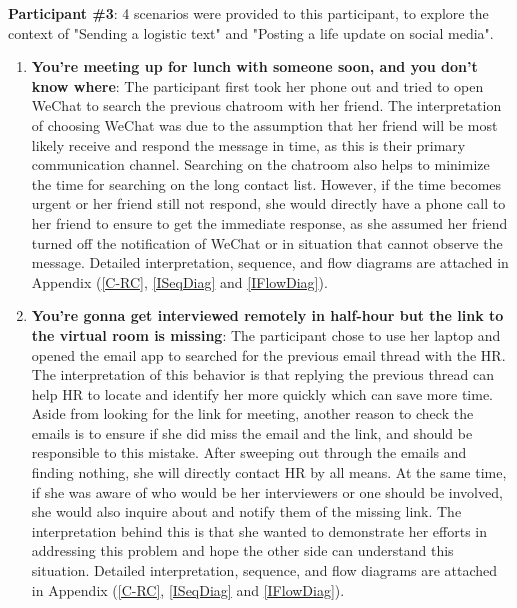 \documentclass[acmsmall,screen,authorversion,nonacm]{acmart}
\begin{document}
\vspace{7pt}

\textbf{Participant \#3}: 4 scenarios were provided to this participant, to explore the context of "Sending a logistic text" and "Posting a life update on social media".

\begin{center}
\begin{enumerate}
    \item \textbf{You’re meeting up for lunch with someone soon, and you don’t know where}: The participant first took her phone out and tried to open WeChat to search the previous chatroom with her friend. The interpretation of choosing WeChat was due to the assumption that her friend will be most likely receive and respond the message in time, as this is their primary communication channel. Searching on the chatroom also helps to minimize the time for searching on the long contact list. However, if the time becomes urgent or her friend still not respond, she would directly have a phone call to her friend to ensure to get the immediate response, as she assumed her friend turned off the notification of WeChat or in situation that cannot observe the message. Detailed interpretation, sequence, and flow diagrams are attached in Appendix (\ref{C-RC}, \ref{ISeqDiag} and \ref{IFlowDiag}). 

    \item \textbf{You’re gonna get interviewed remotely in half-hour but the link to the virtual room is missing}: The participant chose to use her laptop and opened the email app to searched for the previous email thread with the HR. The interpretation of this behavior is that replying the previous thread can help HR to locate and identify her more quickly which can save more time. Aside from looking for the link for meeting, another reason to check the emails is to ensure if she did miss the email and the link, and should be responsible to this mistake. After sweeping out through the emails and finding nothing, she will directly contact HR by all means. At the same time, if she was aware of who would be her interviewers or one should be involved, she would also inquire about and notify them of the missing link. The interpretation behind this is that she wanted to demonstrate her efforts in addressing this problem and hope the other side can understand this situation. Detailed interpretation, sequence, and flow diagrams are attached in Appendix (\ref{C-RC}, \ref{ISeqDiag} and \ref{IFlowDiag}). 


\end{enumerate}
\end{center}
\end{document}

